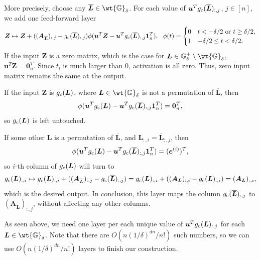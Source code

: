 \documentclass{article} %
\def\vzero{{\bm{0}}}
\def\vone{{\bm{1}}}
\def\ve{{\bm{e}}}
\def\vu{{\bm{u}}}
\def\mA{{\bm{A}}}
\def\mL{{\bm{L}}}
\def\mZ{{\bm{Z}}}
\def\sG{{\mathbb{G}}}
\begin{document}
More precisely, choose any $\overline \mL \in \wt \sG_{\delta}$.
For each value of $\vu^T g_{\rm c}(\overline \mL)_{:,j}$, $j \in [n]$, we add one feed-forward layer
\begin{equation*}
    \mZ \mapsto \mZ + ((\mA_{\overline \mL})_{:,j} - g_{\rm c}({\overline \mL})_{:,j}) \phi (\vu^T \mZ - \vu^T g_{\rm c}({\overline \mL})_{:,j} \vone_n^T),
    ~~
    \phi(t) = 
    \begin{cases}
    0 & t < -\delta/2 \text{ or } t \geq \delta/2,\\
    1 & -\delta/2 \leq t < \delta/2.
    \end{cases}
\end{equation*}
If the input $\mZ$ is a zero matrix, which is the case for $\mL \in \sG^+_{\delta} \setminus \wt \sG_{\delta}$, $\vu^T \mZ = \vzero_n^T$. Since $t_l$ is much larger than $0$, activation is all zero. Thus, zero input matrix remains the same at the output.

If the input $\mZ$ is $g_{\rm c}(\mL)$, where $\mL \in \wt \sG_{\delta}$ is not a permutation of $\overline \mL$, then 
\begin{equation*}
    \phi(\vu^T g_{\rm c}(\mL) - \vu^T g_{\rm c}({\overline \mL})_{:,j} \vone_n^T) = \vzero_n^T,   
\end{equation*}
so $g_{\rm c}(\mL)$ is left untouched.

If some other $\mL$ is a permutation of $\overline \mL$, and $\mL_{:,i} = \overline \mL_{:,j}$, then 
\begin{equation*}
    \phi(\vu^T g_{\rm c}(\mL) - \vu^T g_{\rm c}({\overline \mL})_{:,j} \vone_n^T) = (\ve^{(i)})^T,
\end{equation*}
so $i$-th column of $g_{\rm c}(\mL)$ will turn to
\begin{equation*}
    g_{\rm c}(\mL)_{:,i} \mapsto
    g_{\rm c}(\mL)_{:,i} + ((\mA_{\overline \mL})_{:,j} - g_{\rm c}({\overline \mL})_{:,j})
    = g_{\rm c}(\mL)_{:,i} + ((\mA_\mL)_{:,i} - g_{\rm c}(\mL)_{:,i})
    = (\mA_\mL)_{:,i},
\end{equation*}
which is the desired output.
In conclusion, this layer maps the column $g_{\rm c}(\overline \mL)_{:,j}$ to $(\mA_{\overline \mL})_{:,j}$, without affecting any other columns.

As seen above, we need one layer per each unique value of $\vu^T g_{\rm c}(\mL)_{:,j}$ for each $\mL \in \wt \sG_{\delta}$. Note that there are $O(n(1/\delta)^{dn} / n!)$ such numbers, so we can use $O(n(1/\delta)^{dn} / n!)$ layers to finish our construction.
\end{document}

